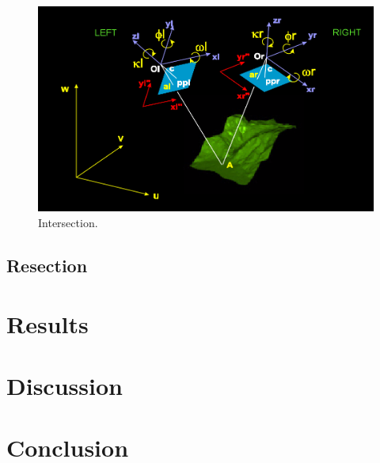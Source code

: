 \documentclass{article}
\begin{document}
\begin{figure}[h!]
\centering
\caption{Intersection.}
\includegraphics[scale=0.2]{intersection}
\end{figure}


\subsection{Resection}



\section{Results}

\section{Discussion}

\section{Conclusion}
\end{document}
